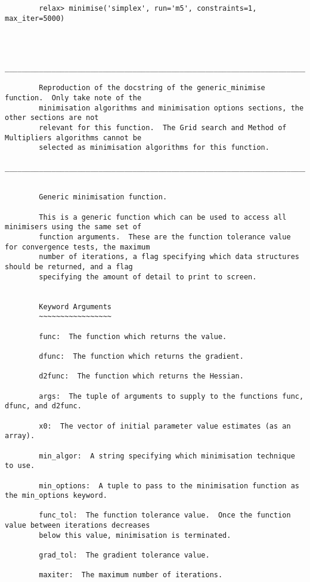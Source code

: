 \begin{verbatim}
        relax> minimise('simplex', run='m5', constraints=1, max_iter=5000)



        ____________________________________________________________________________________________

        Reproduction of the docstring of the generic_minimise function.  Only take note of the
        minimisation algorithms and minimisation options sections, the other sections are not
        relevant for this function.  The Grid search and Method of Multipliers algorithms cannot be
        selected as minimisation algorithms for this function.
        ____________________________________________________________________________________________

        
        Generic minimisation function.
    
        This is a generic function which can be used to access all minimisers using the same set of
        function arguments.  These are the function tolerance value for convergence tests, the maximum
        number of iterations, a flag specifying which data structures should be returned, and a flag
        specifying the amount of detail to print to screen.
    
    
        Keyword Arguments
        ~~~~~~~~~~~~~~~~~
    
        func:  The function which returns the value.
    
        dfunc:  The function which returns the gradient.
    
        d2func:  The function which returns the Hessian.
    
        args:  The tuple of arguments to supply to the functions func, dfunc, and d2func.
    
        x0:  The vector of initial parameter value estimates (as an array).
    
        min_algor:  A string specifying which minimisation technique to use.
    
        min_options:  A tuple to pass to the minimisation function as the min_options keyword.
    
        func_tol:  The function tolerance value.  Once the function value between iterations decreases
        below this value, minimisation is terminated.
    
        grad_tol:  The gradient tolerance value.
    
        maxiter:  The maximum number of iterations.
    

\end{verbatim}
